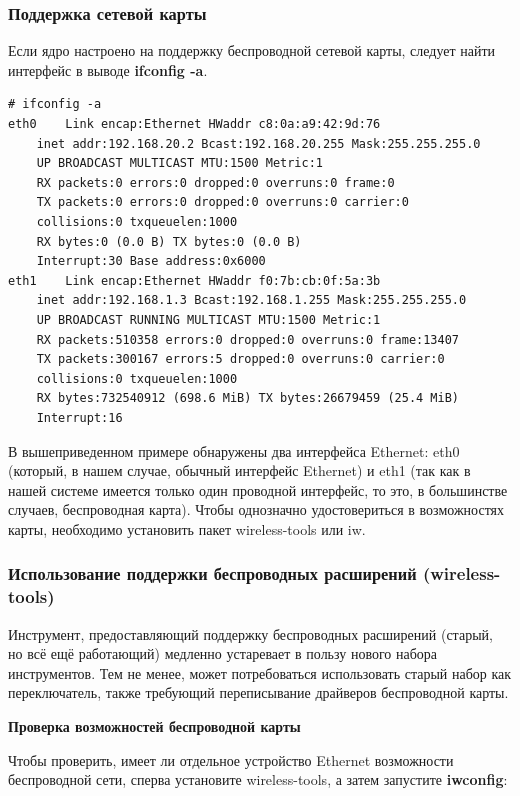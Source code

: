 \documentclass[10pt]{book}
\begin{document}
\subsubsection{Поддержка сетевой карты}
Если ядро настроено на поддержку беспроводной сетевой карты, следует найти интерфейс в выводе \textbf{ifconfig -a}.
\begin{tcolorbox}
\begin{lstlisting}
# ifconfig -a
eth0 	Link encap:Ethernet HWaddr c8:0a:a9:42:9d:76
	inet addr:192.168.20.2 Bcast:192.168.20.255 Mask:255.255.255.0
	UP BROADCAST MULTICAST MTU:1500 Metric:1
	RX packets:0 errors:0 dropped:0 overruns:0 frame:0
	TX packets:0 errors:0 dropped:0 overruns:0 carrier:0
	collisions:0 txqueuelen:1000
	RX bytes:0 (0.0 B) TX bytes:0 (0.0 B)
	Interrupt:30 Base address:0x6000
eth1	Link encap:Ethernet HWaddr f0:7b:cb:0f:5a:3b
	inet addr:192.168.1.3 Bcast:192.168.1.255 Mask:255.255.255.0
	UP BROADCAST RUNNING MULTICAST MTU:1500 Metric:1
	RX packets:510358 errors:0 dropped:0 overruns:0 frame:13407
	TX packets:300167 errors:5 dropped:0 overruns:0 carrier:0
	collisions:0 txqueuelen:1000
	RX bytes:732540912 (698.6 MiB) TX bytes:26679459 (25.4 MiB)
	Interrupt:16	
\end{lstlisting}
\end{tcolorbox}

В вышеприведенном примере обнаружены два интерфейса Ethernet: eth0 (который, в нашем случае, обычный интерфейс Ethernet) и eth1 (так как в нашей системе имеется только один проводной интерфейс, то это, в большинстве случаев, беспроводная карта). Чтобы однозначно удостовериться в возможностях карты, необходимо установить пакет wireless-tools или iw.

\subsubsection{Использование поддержки беспроводных расширений (wireless-tools)}
Инструмент, предоставляющий поддержку беспроводных расширений (старый, но всё ещё работающий) медленно устаревает в пользу нового набора инструментов. Тем не менее, может потребоваться использовать старый набор как переключатель, также требующий переписывание драйверов беспроводной карты.

\textbf{Проверка возможностей беспроводной карты}

Чтобы проверить, имеет ли отдельное устройство Ethernet возможности беспроводной сети,  сперва установите wireless-tools, а затем запустите \textbf{iwconfig}:
\end{document}

